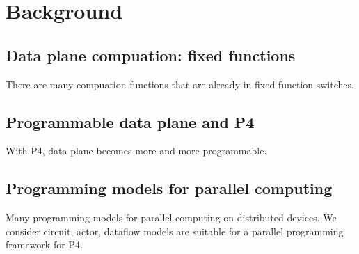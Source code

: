 \section{Background}
\subsection{Data plane compuation: fixed functions}
There are many compuation functions that are already in fixed function switches.

\subsection{Programmable data plane and P4}
With P4, data plane becomes more and more programmable.

\subsection{Programming models for parallel computing}
Many programming models for parallel computing on distributed devices. We consider circuit, actor, dataflow models are suitable for a parallel programming framework for P4.
